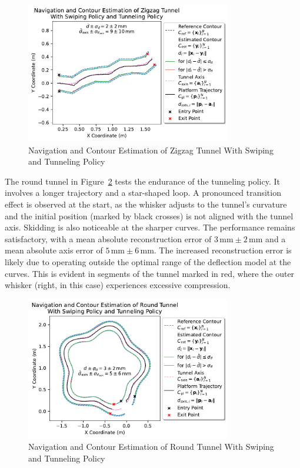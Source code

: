 \begin{figure}[!htb]
    \centering
    \includegraphics[width=0.8\textwidth]{figures/experiments/zigzag-tunnel-swiping-tunneling}
    \caption{Navigation and Contour Estimation of Zigzag Tunnel With Swiping and Tunneling Policy}
    \label{fig:experiment-zigzag-tunnel-swiping-tunneling}
\end{figure}

The round tunnel in Figure~\ref{fig:experiment-round-tunnel-swiping-tunneling} tests the endurance of the tunneling policy.
It involves a longer trajectory and a star-shaped loop.
A pronounced transition effect is observed at the start, as the whisker adjusts to the tunnel’s curvature and the initial position (marked by black crosses) is not aligned with the tunnel axis.
Skidding is also noticeable at the sharper curves.
The performance remains satisfactory, with a mean absolute reconstruction error of $3\,\text{mm} \pm 2\,\text{mm}$ and a mean absolute axis error of $5\,\text{mm} \pm 6\,\text{mm}$.
The increased reconstruction error is likely due to operating outside the optimal range of the deflection model at the curves.
This is evident in segments of the tunnel marked in red, where the outer whisker (right, in this case) experiences excessive compression.

\begin{figure}[!htb]
    \centering
    \includegraphics[width=0.8\textwidth]{figures/experiments/round-tunnel-swiping-tunneling}
    \caption{Navigation and Contour Estimation of Round Tunnel With Swiping and Tunneling Policy}
    \label{fig:experiment-round-tunnel-swiping-tunneling}
\end{figure}

